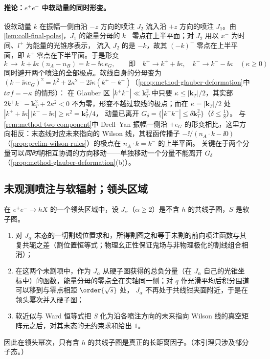 \paragraph{推论：$e^+e^-$ 中软动量的同时形变。}
设软动量 $k$ 在振幅一侧由沿 $-z$ 方向的喷注 $J_2$ 流入沿 $+z$ 方向的喷注 $J_1$。由\cref{lem:coll-final-poles}，$J_1$ 的能量分母的 $k^-$ 零点在上半平面；对 $J_2$ 用以 $x^-$ 为时间、$l^+$ 为能量的光锥序表示，
流入 $J_2$ 的是 $-k$，故其 $(-k)^+$ 零点在上半平面，即 $k^+$ 零点在下半平面。于是形变
\begin{equation}\label{eq:coll-deform}
k\ \to\ k+\ii\kappa\,(n_A-n_B)=k-\ii\kappa\,e_G,\qquad\text{即}\quad k^+\to k^++\ii\kappa,\quad k^-\to k^--\ii\kappa\quad(\kappa\ge0)
\end{equation}
同时避开两个喷注的全部极点\cite[式~(12.48)、(12.49)]{Collins2011}。软线自身的分母变为 $(k-\ii\kappa e_G)^2=k^2+2\kappa^2-2\ii\kappa(k^+-k^-)$（\cref{prop:method-glauber-deformation}中 $t\sigma f=-\kappa$ 的情形）：
在 Glauber 区 $|k^+k^-|\ll\mathbf k_T^2$ 中只要 $\kappa\le|\mathbf k_T|/2$，其实部 $2k^+k^--\mathbf k_T^2+2\kappa^2<0$ 不为零，形变不越过软线的极点；而在 $\kappa=|\mathbf k_T|/2$ 处 $|k^++\ii\kappa|\,|k^--\ii\kappa|\ge\kappa^2=\mathbf k_T^2/4$，
动量已离开 $G_\delta=\{|k^+k^-|\le\delta\mathbf k_T^2\}$（$\delta\le\frac18$）。%
与\cref{rem:method-two-component}中 Drell--Yan 振幅一侧沿 $+e_G$ 的形变相比，这里方向相反：末态线对应未来指向的 Wilson 线，其程函传播子 $-\ii/(n_A\cdot k-\ii0)$（\cref{prop:prelim-wilson-rules}）的极点在 $n_A\cdot k=k^-$ 的上半平面。
关键在于两个分量可以\emph{同时}朝相互协调的方向移动——单独移动一个分量不能离开 $G_\delta$（\cref{prop:method-glauber-deformation}(b)）。

\subsection{未观测喷注与软辐射；领头区域}

\begin{lemma}\label{lem:coll-unobserved-jet}
在 $e^+e^-\to hX$ 的一个领头区域中，设 $J_\alpha$（$\alpha\ge2$）是不含 $h$ 的共线子图，$S$ 是软子图。
\begin{enumerate}[label=(\alph*),leftmargin=2em,itemsep=1pt,topsep=2pt]
\item 对 $J_\alpha$ 末态的一切割线位置求和，所得割图之和等于未割的前向喷注函数与其复共轭之差（割位置恒等式；物理幺正性保证鬼场与非物理极化的割线组合相消）；
\item 在这两个未割项中，作为 $J_\alpha$ 从硬子图获得的总负分量（在 $J_\alpha$ 自己的光锥坐标中）的函数，能量分母的零点全在实轴同一侧；对 $q$ 作光滑平均后积分围道可以移到与零点相距 $\order{\sqrt s}$ 处，
$J_\alpha$ 不再处于共线钳夹面附近，于是在领头幂次并入硬子图；
\item 软近似与 Ward 恒等式把 $S$ 化为沿各喷注方向的未来指向 Wilson 线的真空矩阵元之后，对其末态的无约束求和给出 $1$。
\end{enumerate}
因此在领头幂次，只有含 $h$ 的共线子图是真正的长距离因子。（本引理只涉及部分子态。）
\end{lemma}

